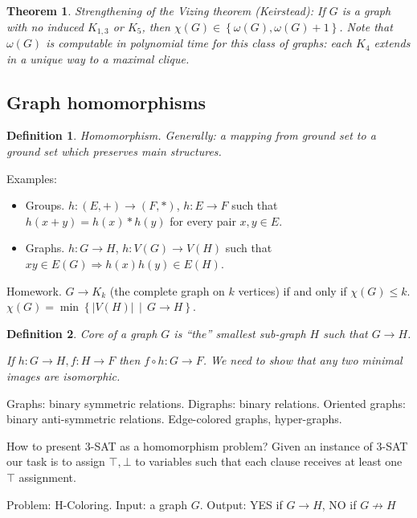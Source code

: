 \documentclass[12pt,a4paper]{article}
\newtheorem{theorem}{Theorem}
\newtheorem{definition}{Definition}
\begin{document}
\begin{theorem}
  Strengthening of the Vizing theorem (Keirstead): If \(G\) is a graph with no
  induced \(K_{1,3}\) or \(K_5\), then
  \(\chi(G) \in \left\{\omega(G), \omega(G) + 1\right\}\).  Note that
  \(\omega(G)\) is computable in polynomial time for this class of graphs: each
  \(K_4\) extends in a unique way to a maximal clique.
\end{theorem}

\subsection{Graph homomorphisms}

\begin{definition}
  Homomorphism.  Generally: a mapping from ground set to a ground set which
  preserves main structures.
\end{definition}

Examples:
\begin{itemize}
\item Groups. \(h: (E, +) \to (F, *)\), \(h: E \to F\) such that
  \(h(x + y) = h(x) * h(y)\) for every pair \(x, y \in E\).
\item Graphs. \(h: G \to H\), \(h: V(G) \to V(H)\) such that \(xy \in E(G)
  \Rightarrow h(x)h(y) \in E(H)\).
\end{itemize}

Homework. \(G \to K_k\) (the complete graph on \(k\) vertices) if and only if
\(\chi(G) \leq k\).
\(\chi(G) = \min\left\{|V(H)| \,\middle|\, G \to H\right\}\).

\begin{definition}
  Core of a graph \(G\) is \enquote{the} smallest sub-graph \(H\) such that \(G
  \to H\).

  If \(h: G \to H, f: H \to F\) then \(f \circ h: G \to F\).  We need to show
  that any two minimal images are isomorphic.
\end{definition}

Graphs: binary symmetric relations.
Digraphs: binary relations.
Oriented graphs: binary anti-symmetric relations.
Edge-colored graphs, hyper-graphs.

How to present \(3\)-SAT as a homomorphism problem?  Given an instance of
\(3\)-SAT our task is to assign \(\top, \bot\) to variables such that each
clause receives at least one \(\top\) assignment.

Problem: H-Coloring.
Input: a graph \(G\).
Output: YES if \(G \to H\), NO if \(G \not\to H\)
\end{document}
